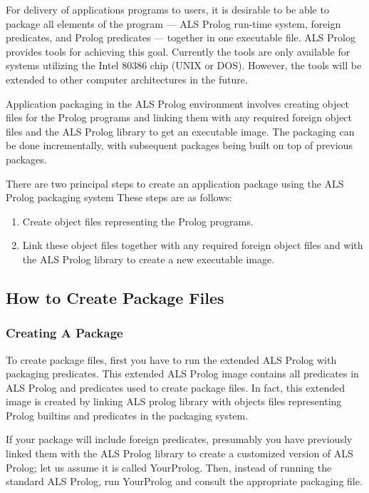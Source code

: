 \label{Packaging}

For delivery of applications programs to users, it is desirable to be
able to package all elements of the program --- ALS Prolog run-time system,
foreign predicates, and Prolog predicates --- together in one executable file.
ALS Prolog provides tools for achieving this goal.  Currently the tools are
only available for systems utilizing the Intel 80386 chip (UNIX or DOS).  However,
the tools will be extended to other computer architectures in the future.

Application packaging in the ALS Prolog environment involves 
creating object files for the Prolog programs and linking them with 
any required foreign object files and the
ALS Prolog library to get an executable image.  The packaging can be done incrementally,
with subsequent packages being built on top of previous packages.

There are two principal steps to create an application package using
the ALS Prolog packaging system 
These steps are as follows:

\begin{enumerate}
\item Create object files representing the Prolog programs.
\item Link these object files together with any required foreign object files and with the 
ALS Prolog library to create a new executable image.
\end{enumerate}

\subsection{How to Create Package Files}

\subsubsection{Creating A Package}

To create package files, first you have to run the extended ALS Prolog 
with packaging predicates. 
This extended ALS Prolog image contains all predicates in ALS Prolog and
predicates used to create package files.
In fact, this extended image is created by linking ALS prolog library
with objects files representing Prolog builtins and predicates in
the packaging system.


If your package will include foreign predicates, presumably you have previously linked 
them with the ALS Prolog library to create a customized version of ALS Prolog;  
let us assume it is called YourProlog.  Then, instead of running the standard 
ALS Prolog, run YourProlog and consult the appropriate packaging file.

